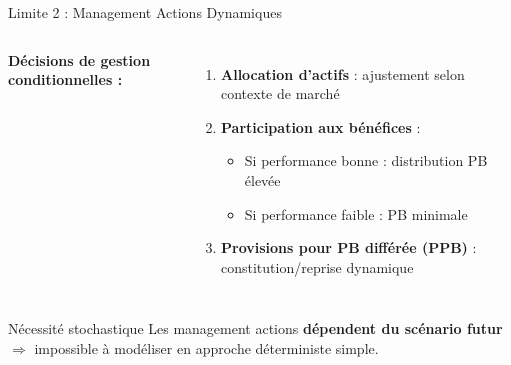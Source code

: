 \documentclass[10pt,aspectratio=169]{beamer}
\begin{document}
\begin{frame}{Limite 2 : Management Actions Dynamiques}
\begin{columns}
\textbf{Décisions de gestion conditionnelles :}
\begin{enumerate}
    \item \textbf{Allocation d'actifs} : ajustement selon contexte de marché
    \item \textbf{Participation aux bénéfices} :
    \begin{itemize}
        \item Si performance bonne : distribution PB élevée
        \item Si performance faible : PB minimale
    \end{itemize}
    \item \textbf{Provisions pour PB différée (PPB)} : constitution/reprise dynamique
\end{enumerate}

\end{columns}

\vspace{0.3cm}
\begin{exampleblock}{Nécessité stochastique}
Les management actions \textbf{dépendent du scénario futur} $\Rightarrow$ impossible à modéliser en approche déterministe simple.
\end{exampleblock}
\end{frame}
\end{document}

